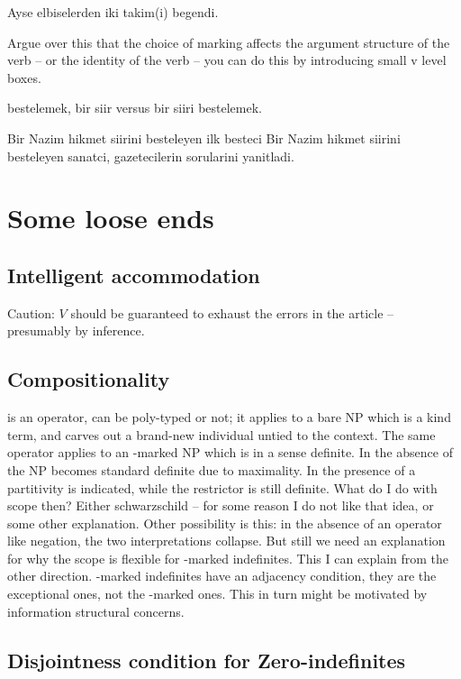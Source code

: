 \documentclass[11pt,a4paper]{article}
\begin{document}
Ayse elbiselerden iki takim(i) begendi.

Argue over this that the choice of marking affects the argument
structure of the verb -- or the identity of the verb -- you can do
this by introducing small v level boxes. 


bestelemek, bir siir versus bir siiri bestelemek.


Bir Nazim hikmet siirini besteleyen ilk besteci
Bir Nazim hikmet siirini besteleyen sanatci, gazetecilerin sorularini yanitladi.

\section{Some loose ends}
\label{scloose}

\subsection{Intelligent accommodation}

Caution: $V$ should be guaranteed to exhaust the errors in the article
-- presumably by inference.

\subsection{Compositionality}

 is an operator, can be poly-typed or not; it applies to a
bare NP which is a kind term, and carves out a brand-new individual
untied to the context. The same operator applies to an \acc-marked NP
which is in a sense definite. In the absence of  the NP
becomes standard definite due to maximality. In the presence of
 a partitivity is indicated, while the restrictor is still
definite. What do I do with scope then? Either schwarzschild -- for
some reason I do not like that idea, or some other explanation. Other
possibility is this: in the absence of an operator like negation, the
two interpretations collapse. But still we need an explanation for why
the scope is flexible for \acc-marked indefinites. This I can explain
from the other direction. \zero-marked indefinites have an adjacency
condition, they are the exceptional ones, not the \acc-marked ones.
This in turn might be motivated by information structural concerns.    

\subsection{Disjointness condition for Zero-indefinites}
\end{document}
